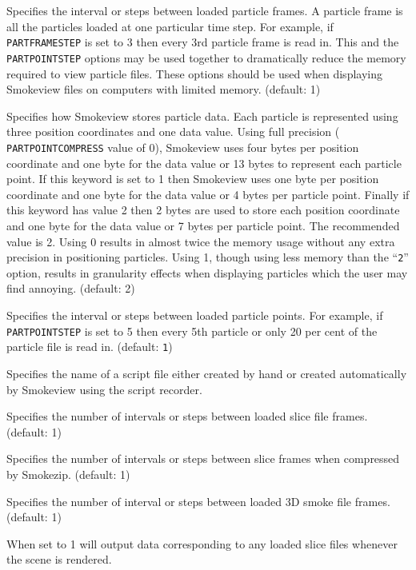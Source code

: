 \documentclass[11pt,twoside]{book}
\newcommand{\hitem}[1]{\item[{\bf #1} \hfill]}
\begin{document}
\hitem{PARTFRAMESTEP}Specifies the interval or steps between
loaded particle frames.  A particle frame is all the particles
loaded at one particular time step. For example, if {\tt
PARTFRAMESTEP} is set to 3 then every 3rd particle frame is read
in. This and the {\tt PARTPOINTSTEP} options may be used together
to dramatically reduce the memory required to view particle
files.  These options should be used when displaying Smokeview
files on computers with limited memory. (default: 1)

\hitem{PARTPOINTCOMPRESS}Specifies how Smokeview stores particle
data. Each particle is represented using three position
coordinates and one data value.  Using full precision ({\tt
PARTPOINTCOMPRESS} value of 0), Smokeview uses four bytes per
position coordinate and one byte for the data value or 13 bytes to
represent each particle point. If this keyword is set to 1 then
Smokeview uses one byte per position coordinate and one byte for
the data value or 4 bytes per particle point.  Finally if this
keyword has value 2 then 2 bytes are used to store each position
coordinate and one byte for the data value or 7 bytes per particle
point.  The recommended value is 2.  Using 0 results in almost
twice the memory usage without any extra precision in positioning
particles. Using 1, though using less memory than the ``{\tt 2}''
option, results in granularity effects when displaying particles
which the user may find annoying. (default: 2)

\hitem{PARTPOINTSTEP}Specifies the
interval or steps between loaded particle points.
For example, if {\tt PARTPOINTSTEP} is set to 5 then every 5th particle or
only 20 per cent of the particle file is read in.  (default: {\tt 1})

\hitem{SCRIPTFILE} Specifies the name of a script file either created by
hand or created automatically
by Smokeview using the script recorder.

\hitem{SLICEFRAMESTEP}Specifies the number of
intervals or steps between loaded slice file frames.  (default: 1)

\hitem{SLICEZIPSTEP}  Specifies the number of intervals or steps between
slice frames when compressed
by Smokezip.  (default: 1)

\hitem{SMOKE3DFRAMESTEP}Specifies the number of
interval or steps between loaded 3D smoke file frames.  (default: 1)

\hitem{SMOKE3DZIPSTEPxxx}

\hitem{SLICEDATAOUT}When set to 1 will output data corresponding
to any loaded slice files whenever the scene is rendered.
\end{document}
